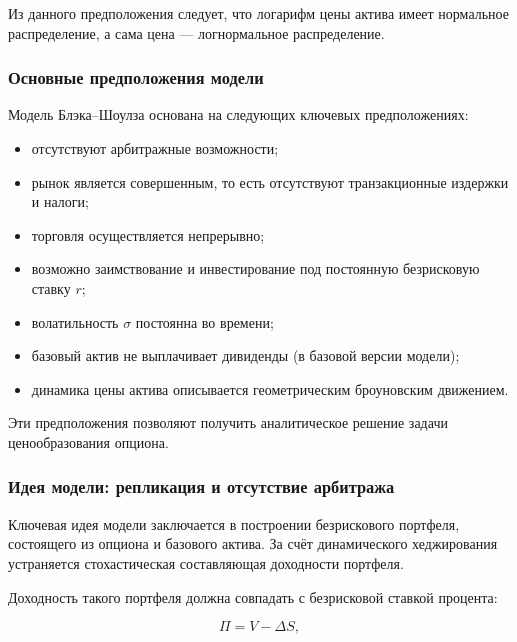 \documentclass[11pt,a4paper]{article}
\begin{document}
Из данного предположения следует, что логарифм цены актива имеет нормальное распределение, а сама цена --- логнормальное распределение.

\subsubsection{Основные предположения модели}

Модель Блэка--Шоулза основана на следующих ключевых предположениях:

\begin{itemize}
    \item отсутствуют арбитражные возможности;
    
    \item рынок является совершенным, то есть отсутствуют транзакционные издержки и налоги;
    
    \item торговля осуществляется непрерывно;
    
    \item возможно заимствование и инвестирование под постоянную безрисковую ставку $r$;
    
    \item волатильность $\sigma$ постоянна во времени;
    
    \item базовый актив не выплачивает дивиденды (в базовой версии модели);
    
    \item динамика цены актива описывается геометрическим броуновским движением.
\end{itemize}

Эти предположения позволяют получить аналитическое решение задачи ценообразования опциона.

\subsubsection{Идея модели: репликация и отсутствие арбитража}

Ключевая идея модели заключается в построении безрискового портфеля, состоящего из опциона и базового актива. За счёт динамического хеджирования устраняется стохастическая составляющая доходности портфеля.

Доходность такого портфеля должна совпадать с безрисковой ставкой процента:

\begin{equation}
\Pi = V - \Delta S,
\end{equation}
\end{document}

